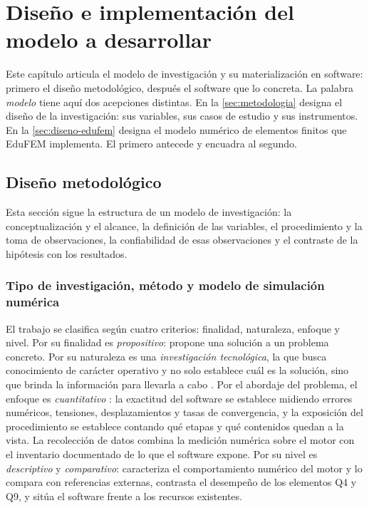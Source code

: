 \chapter{Diseño e implementación del modelo a desarrollar}
\label{cap:diseno}

Este capítulo articula el modelo de investigación y su materialización en software: primero el diseño metodológico, después el software que lo concreta. La palabra \emph{modelo} tiene aquí dos acepciones distintas. En la \autoref{sec:metodologia} designa el diseño de la investigación: sus variables, sus casos de estudio y sus instrumentos. En la \autoref{sec:diseno-edufem} designa el modelo numérico de elementos finitos que EduFEM implementa. El primero antecede y encuadra al segundo.

\section{Diseño metodológico}
\label{sec:metodologia}

Esta sección sigue la estructura de un modelo de investigación: la conceptualización y el alcance, la definición de las variables, el procedimiento y la toma de observaciones, la confiabilidad de esas observaciones y el contraste de la hipótesis con los resultados.

\subsection{Tipo de investigación, método y modelo de simulación numérica}
\label{sec:proceso-met}

El trabajo se clasifica según cuatro criterios: finalidad, naturaleza, enfoque y nivel. Por su finalidad es \emph{propositivo}: propone una solución a un problema concreto. Por su naturaleza es una \emph{investigación tecnológica}, la que busca conocimiento de carácter operativo y no solo establece cuál es la solución, sino que brinda la información para llevarla a cabo \autocite[p.~91]{garciacordoba2005tecnologica}. Por el abordaje del problema, el enfoque es \emph{cuantitativo} \autocite[p.~6]{sampieri2018metodologia}: la exactitud del software se establece midiendo errores numéricos, tensiones, desplazamientos y tasas de convergencia, y la exposición del procedimiento se establece contando qué etapas y qué contenidos quedan a la vista. La recolección de datos combina la medición numérica sobre el motor con el inventario documentado de lo que el software expone. Por su nivel es \emph{descriptivo} y \emph{comparativo}: caracteriza el comportamiento numérico del motor y lo compara con referencias externas, contrasta el desempeño de los elementos Q4 y Q9, y sitúa el software frente a los recursos existentes.

